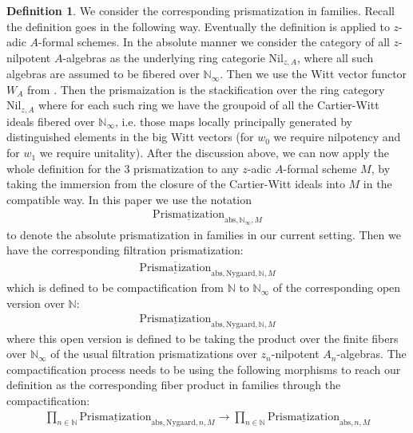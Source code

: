 \documentclass[12pt]{article}
\theoremstyle{definition}
\newtheorem{definition}{Definition}
\begin{document}
\begin{definition} 
We consider the corresponding prismatization in families. Recall the definition goes in the following way. Eventually the definition is applied to $z$-adic $A$-formal schemes. In the absolute manner we consider the category of all $z$-nilpotent $A$-algebras as the underlying ring categorie $\mathrm{Nil}_{z,A}$, where all such algebras are assumed to be fibered over $\mathbb{N}_\infty$. Then we use the Witt vector functor $W_A$ from \cite{3LH}. Then the prismaization is the stackification over the ring category $\mathrm{Nil}_{z,A}$ where for each such ring we have the groupoid of all the Cartier-Witt ideals fibered over $\mathbb{N}_\infty$, i.e. those maps locally principally generated by distinguished elements in the big Witt vectors (for $w_0$ we require nilpotency and for $w_1$ we require unitality). After the discussion above, we can now apply the whole definition for the 3 prismatization to any $z$-adic $A$-formal scheme $M$, by taking the immersion from the closure of the Cartier-Witt ideals into $M$ in the compatible way. In this paper we use the notation 
\begin{align}
\underline{\mathrm{Prismatization}}_{\mathrm{abs},\mathbb{N}_\infty,M}
\end{align}
to denote the absolute prismatization in families in our current setting. Then we have the corresponding filtration prismatization:
\begin{align}
\overline{\underline{\mathrm{Prismatization}}}_{\mathrm{abs},\mathrm{Nygaard},\mathbb{N},M}
\end{align}
which is defined to be compactification from $\mathbb{N}$ to $\mathbb{N}_\infty$ of the corresponding open version over $\mathbb{N}$:
\begin{align}
{\underline{\mathrm{Prismatization}}}_{\mathrm{abs},\mathrm{Nygaard},\mathbb{N},M}
\end{align}
where this open version is defined to be taking the product over the finite fibers over $\mathbb{N}_\infty$ of the usual filtration prismatizations over $z_n$-nilpotent $A_n$-algebras. The compactification process needs to be using the following morphisms to reach our definition as the corresponding fiber product in families through the compactification:
\begin{align}
\prod_{n\in \mathbb{N}} {\underline{\mathrm{Prismatization}}}_{\mathrm{abs},\mathrm{Nygaard},n,M}\rightarrow  \prod_{n\in \mathbb{N}} {\underline{\mathrm{Prismatization}}}_{\mathrm{abs},n,M}
\end{align}

\end{definition}
\end{document}
